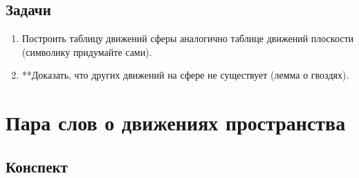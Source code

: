 \subsection*{Задачи}
\begin{enumerate}
\item Построить таблицу движений сферы аналогично таблице движений плоскости (символику придумайте сами).
\item **Доказать, что других движений на сфере не существует (лемма о гвоздях).
\end{enumerate}


\section{Пара слов о движениях пространства}
\subsection*{Конспект}
